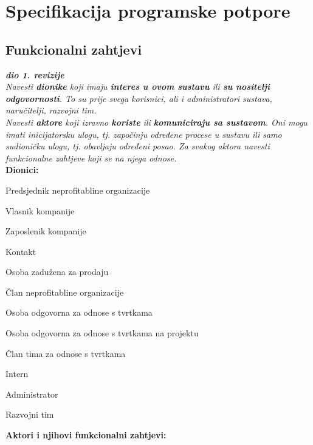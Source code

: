 \chapter{Specifikacija programske potpore}
		
	\section{Funkcionalni zahtjevi}
			
			\textbf{\textit{dio 1. revizije}}\\
			
			\textit{Navesti \textbf{dionike} koji imaju \textbf{interes u ovom sustavu} ili \textbf{su nositelji odgovornosti}. To su prije svega korisnici, ali i administratori sustava, naručitelji, razvojni tim.}\\
				
			\textit{Navesti \textbf{aktore} koji izravno \textbf{koriste} ili \textbf{komuniciraju sa sustavom}. Oni mogu imati inicijatorsku ulogu, tj. započinju određene procese u sustavu ili samo sudioničku ulogu, tj. obavljaju određeni posao. Za svakog aktora navesti funkcionalne zahtjeve koji se na njega odnose.}\\
			
			
			\noindent \textbf{Dionici:}
			
			\begin{packed_enum}
				
				\item Predsjednik neprofitabline organizacije
				\item Vlasnik kompanije
				\item Zaposlenik kompanije
					\item Kontakt
					\item Osoba zadužena za prodaju
				\item Član neprofitabline organizacije
					\item Osoba odgovorna za odnose s tvrtkama
					\item Osoba odgovorna za odnose s tvrtkama na projektu
					\item Član tima za odnose s tvrtkama
					\item Intern
				\item Administrator
				\item Razvojni tim
				
			\end{packed_enum}
			
			\noindent \textbf{Aktori i njihovi funkcionalni zahtjevi:}
			
